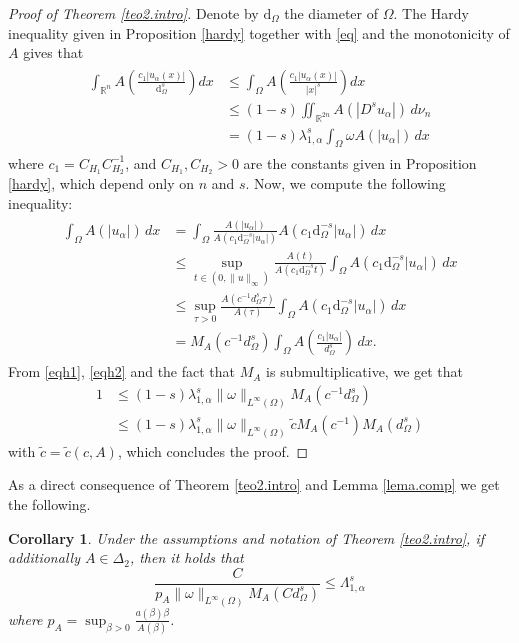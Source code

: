 \documentclass[12pt,reqno]{amsart}
\newtheorem{cor}[thm]{Corollary}
\theoremstyle{definition}
\theoremstyle{remark}
\numberwithin{equation}{section}
\begin{document}
\begin{proof}[Proof of Theorem \ref{teo2.intro}]
Denote by $\text{d}_\Omega$ the diameter of $\Omega$. The Hardy inequality given in Proposition \ref{hardy} together with \eqref{eq} and the monotonicity of $A$ gives that
\begin{align} \label{eqh1} 
\begin{split}
\int_{\mathbb{R}^n} A\left(\frac{c_1 |u_\alpha(x)|}{\text{d}_\Omega^s}\right)dx &\leq \int_\Omega A\left(\frac{c_1|u_\alpha(x)|}{|x|^s}\right)dx\\
& \leq (1-s)\iint_{\mathbb{R}^{2n}} A(|D^s u_\alpha|) \,d\nu_n\\
& =(1-s) \lambda_{1,\alpha}^s \int_\Omega \omega A(|u_\alpha|)\,dx
\end{split}
\end{align}
where $c_1=C_{H_1}C_{H_2}^{-1}$, and  $C_{H_1}, C_{H_2}>0$ are the constants given in Proposition \ref{hardy}, which depend only on $n$ and $s$. Now, we compute the following inequality:
\begin{align} \label{eqh2}
\begin{split}
\int_\Omega A(|u_\alpha|)\,dx &= \int_\Omega \frac{A(|u_\alpha|)}{A(c_1 \text{d}_\Omega^{-s}|u_\alpha| ) } A(c_1 \text{d}_\Omega^{-s}|u_\alpha| )\,dx\\
&\leq 
\sup_{t\in (0, \|u\|_\infty)}  \frac{A(t)}{A(c_1 \text{d}_\Omega^{-s} t)}   \int_\Omega A(c_1 \text{d}_\Omega^{-s}|u_\alpha| )\,dx\\
&\leq 
\sup_{\tau >0} \frac{A(c^{-1} d_\Omega^s \tau)}{A(\tau)} \int_\Omega A(c_1 \text{d}_\Omega^{-s}|u_\alpha| )\,dx\\
&= M_A(c^{-1} d_\Omega^s) \int_\Omega A\left(\frac{c_1 |u_\alpha|}{d_\Omega^s} \right)\,dx.
\end{split}
\end{align}
From \eqref{eqh1}, \eqref{eqh2} and the fact that $M_A$ is submultiplicative, we get that
\begin{align*}
1&\leq (1-s)\lambda_{1,\alpha}^s \|\omega\|_{L^\infty(\Omega)}  M_A(c^{-1} d_\Omega^s)\\ 
&\leq 
(1-s)\lambda_{1,\alpha}^s \|\omega\|_{L^\infty(\Omega)}  \tilde c M_A(c^{-1}) M_A(d_\Omega^s)
\end{align*}
with $\tilde c= \tilde c(c,A)$, which concludes the proof.
\end{proof}

 

As a direct consequence of  Theorem \ref{teo2.intro} and Lemma \ref{lema.comp} we get the following.
\begin{cor} \label{coro.2}
Under the assumptions and notation of Theorem \ref{teo2.intro}, if additionally $A\in \Delta_2$, then it holds that
$$
\frac{C}{p_A\|\omega\|_{L^\infty(\Omega)} M_A(C d_\Omega^s) } \le \Lambda_{1,\alpha}^s
$$
where  $p_A=\sup_{\beta>0} \frac{a(\beta)\beta}{A(\beta)}$.
\end{cor}
\end{document}
